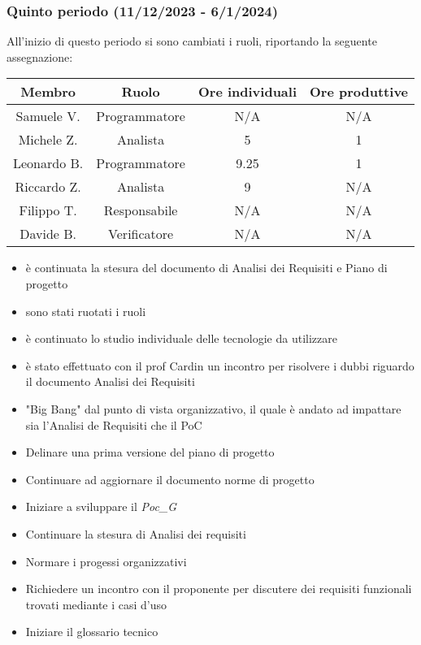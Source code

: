 \subsubsection{Quinto periodo (11/12/2023 - 6/1/2024)}
All'inizio di questo periodo si sono cambiati i ruoli, riportando la seguente assegnazione:

\vspace{10 mm}
\begin{tabular}{|c|c|c|c|}
\hline
\textbf{Membro} & \textbf{Ruolo} & \textbf{Ore individuali} & \textbf{Ore produttive} \\
\hline
Samuele V. & Programmatore & N/A & N/A \\
\hline
Michele Z. & Analista & 5 & 1 \\
\hline
Leonardo B. & Programmatore & 9.25 & 1 \\
\hline
Riccardo Z. & Analista & 9 & N/A \\
\hline
Filippo T. & Responsabile & N/A & N/A \\
\hline
Davide B. & Verificatore & N/A & N/A \\
\hline
\end{tabular}
\vspace{10 mm}

\begin{itemize}
    \item è continuata la stesura del documento di Analisi dei Requisiti e Piano di progetto
    \item sono stati ruotati i ruoli
    \item è continuato lo studio individuale delle tecnologie da utilizzare
    \item è stato effettuato con il prof Cardin un incontro per risolvere i dubbi riguardo il documento Analisi dei Requisiti
    \item "Big Bang" dal punto di vista organizzativo, il quale è andato ad impattare sia l'Analisi de Requisiti che il PoC
\end{itemize}

\begin{itemize}
    \item Delinare una prima versione del piano di progetto
    \item Continuare ad aggiornare il documento norme di progetto
    \item Iniziare a sviluppare il \textit{Poc_G} 
    \item Continuare la stesura di Analisi dei requisiti
    \item Normare i progessi organizzativi
    \item Richiedere un incontro con il proponente per discutere dei requisiti funzionali trovati mediante i casi d'uso
    \item Iniziare il glossario tecnico
\end{itemize}

